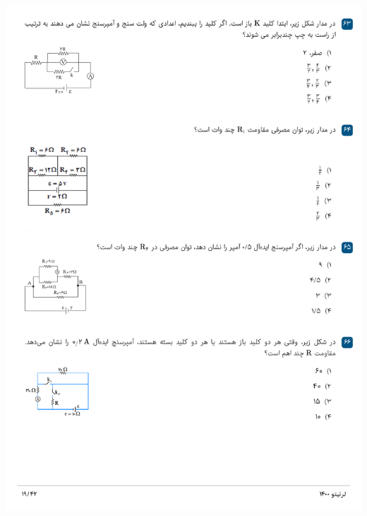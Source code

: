 \documentclass{book}
\begin{document}
\includegraphics[width=\textwidth]{"pages/19"}
\end{document}
